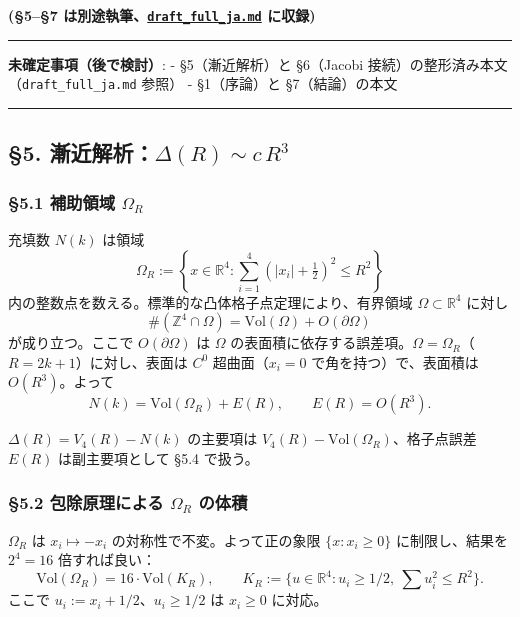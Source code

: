 \documentclass[a4paper,11pt]{ltjsarticle}
\theoremstyle{definition}
\begin{document}
\textbf{(§5--§7
は別途執筆、\href{draft_full_ja.md}{\texttt{draft\_full\_ja.md}}
に収録)}

\begin{center}\rule{0.5\linewidth}{0.5pt}\end{center}

\textbf{未確定事項（後で検討）}: - §5（漸近解析）と §6（Jacobi
接続）の整形済み本文（\texttt{draft\_full\_ja.md} 参照） - §1（序論）と
§7（結論）の本文

\begin{center}\rule{0.5\linewidth}{0.5pt}\end{center}

\subsection{\texorpdfstring{§5.
漸近解析：\(\Delta(R) \sim c\,R^3\)}{§5. 漸近解析：\textbackslash Delta(R) \textbackslash sim c\textbackslash,R\^{}3}}\label{ux6f38ux8fd1ux89e3ux6790deltar-sim-cr3}

\subsubsection{\texorpdfstring{§5.1 補助領域
\(\Omega_R\)}{§5.1 補助領域 \textbackslash Omega\_R}}\label{ux88dcux52a9ux9818ux57df-omega_r}

充填数 \(N(k)\) は領域
\[\Omega_R := \left\{x \in \mathbb{R}^4 : \sum_{i=1}^{4} (|x_i| + \tfrac{1}{2})^2 \le R^2\right\}\]
内の整数点を数える。標準的な凸体格子点定理により、有界領域
\(\Omega \subset \mathbb{R}^4\) に対し
\[\#(\mathbb{Z}^4 \cap \Omega) = \mathrm{Vol}(\Omega) + O(\partial\Omega)\]
が成り立つ。ここで \(O(\partial\Omega)\) は \(\Omega\)
の表面積に依存する誤差項。\(\Omega = \Omega_R\)（\(R = 2k+1\)）に対し、表面は
\(C^0\) 超曲面（\(x_i = 0\) で角を持つ）で、表面積は \(O(R^3)\)。よって
\[N(k) = \mathrm{Vol}(\Omega_R) + E(R), \qquad E(R) = O(R^3).\]

\(\Delta(R) = V_4(R) - N(k)\) の主要項は
\(V_4(R) - \mathrm{Vol}(\Omega_R)\)、格子点誤差 \(E(R)\)
は副主要項として §5.4 で扱う。

\subsubsection{\texorpdfstring{§5.2 包除原理による \(\Omega_R\)
の体積}{§5.2 包除原理による \textbackslash Omega\_R の体積}}\label{ux5305ux9664ux539fux7406ux306bux3088ux308b-omega_r-ux306eux4f53ux7a4d}

\(\Omega_R\) は \(x_i \mapsto -x_i\) の対称性で不変。よって正の象限
\(\{x : x_i \ge 0\}\) に制限し、結果を \(2^4 = 16\) 倍すれば良い：
\[\mathrm{Vol}(\Omega_R) = 16 \cdot \mathrm{Vol}(K_R), \qquad K_R := \{u \in \mathbb{R}^4 : u_i \ge 1/2,\ \textstyle\sum u_i^2 \le R^2\}.\]
ここで \(u_i := x_i + 1/2\)、\(u_i \ge 1/2\) は \(x_i \ge 0\) に対応。
\end{document}
